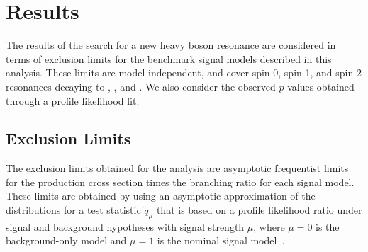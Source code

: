 
\section{Results}
\label{sec:results}

The results of the search for a new heavy boson resonance are considered in terms of exclusion limits for the benchmark signal models described in this analysis.
These limits are model-independent, and cover spin-0, spin-1, and spin-2 resonances decaying to \WW, \WZ, and \WH.
We also consider the observed $p$-values obtained through a profile likelihood fit.

\subsection{Exclusion Limits}

The exclusion limits obtained for the analysis are asymptotic frequentist limits for the production cross section times the branching ratio for each signal model.
These limits are obtained by using an asymptotic approximation of the distributions for a test statistic $\tilde{q}_\mu$ that is based on a profile likelihood ratio under signal and background hypotheses with signal strength $\mu$, where $\mu=0$ is the background-only model and $\mu=1$ is the nominal signal model~\cite{Cowan_2011}.

